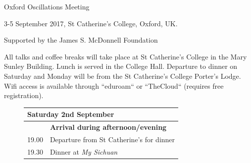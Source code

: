 \documentclass[11pt,a4paper]{article}
\begin{document}
{\Huge Oxford Oscillations Meeting}

3-5 September 2017, St Catherine's College, Oxford, UK.

Supported by the James S. McDonnell Foundation

\vspace{1cm}
\parbox{.85\textwidth}{\raggedright All talks and coffee breaks will take place at St Catherine's College in the Mary Sunley Building. Lunch is served in the College Hall. Departure to dinner on Saturday and Monday will be from the St Catherine's College Porter's Lodge. Wifi access is available through ``eduroam`` or ``TheCloud`` (requires free registration).}

\vspace{1cm}
\begin{figure}[h]
\centering
\begin{tabularx}{.95\textwidth}{l p{.8\linewidth}}
\multicolumn{2}{l}{\Large Saturday 2nd September }\\
\toprule
& {\bf Arrival during afternoon/evening}\\
19.00 & Departure from St Catherine's for dinner\\
19.30 & Dinner at {\it My Sichuan}\\
\end{tabularx}
\end{figure}
\end{document}
